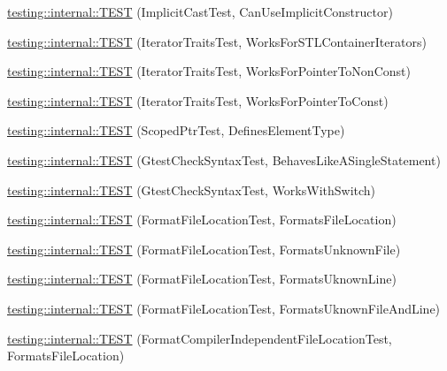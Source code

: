 \begin{DoxyCompactItemize}
\item 
\hyperlink{namespacetesting_1_1internal_ad5c2cf37cc5aa78744012255cae78f9b}{testing\+::internal\+::\+T\+E\+ST} (Implicit\+Cast\+Test, Can\+Use\+Implicit\+Constructor)
\item 
\hyperlink{namespacetesting_1_1internal_abd56ca990c5b8c1aea44d15028a74f33}{testing\+::internal\+::\+T\+E\+ST} (Iterator\+Traits\+Test, Works\+For\+S\+T\+L\+Container\+Iterators)
\item 
\hyperlink{namespacetesting_1_1internal_a642234d85836450bb8795cf0a8a9f908}{testing\+::internal\+::\+T\+E\+ST} (Iterator\+Traits\+Test, Works\+For\+Pointer\+To\+Non\+Const)
\item 
\hyperlink{namespacetesting_1_1internal_afc0e95a0472d243967fd4720c681c478}{testing\+::internal\+::\+T\+E\+ST} (Iterator\+Traits\+Test, Works\+For\+Pointer\+To\+Const)
\item 
\hyperlink{namespacetesting_1_1internal_a99f56e2e9d5b30a879f877cc72bb0c0c}{testing\+::internal\+::\+T\+E\+ST} (Scoped\+Ptr\+Test, Defines\+Element\+Type)
\item 
\hyperlink{namespacetesting_1_1internal_a26d00130a017a66d0d60dc5a02a13d25}{testing\+::internal\+::\+T\+E\+ST} (Gtest\+Check\+Syntax\+Test, Behaves\+Like\+A\+Single\+Statement)
\item 
\hyperlink{namespacetesting_1_1internal_a4dfd147ff396984fca799878cb53dcea}{testing\+::internal\+::\+T\+E\+ST} (Gtest\+Check\+Syntax\+Test, Works\+With\+Switch)
\item 
\hyperlink{namespacetesting_1_1internal_a1a1c20d78e9e75b9c7f2b767eb62611b}{testing\+::internal\+::\+T\+E\+ST} (Format\+File\+Location\+Test, Formats\+File\+Location)
\item 
\hyperlink{namespacetesting_1_1internal_ace2f5407afdfb0767035d44b6758e4a0}{testing\+::internal\+::\+T\+E\+ST} (Format\+File\+Location\+Test, Formats\+Unknown\+File)
\item 
\hyperlink{namespacetesting_1_1internal_a17d1f472b6c1154de7b5b008b964ee32}{testing\+::internal\+::\+T\+E\+ST} (Format\+File\+Location\+Test, Formats\+Uknown\+Line)
\item 
\hyperlink{namespacetesting_1_1internal_a1195aaf7258c5442de7aebd95acefb9f}{testing\+::internal\+::\+T\+E\+ST} (Format\+File\+Location\+Test, Formats\+Uknown\+File\+And\+Line)
\item 
\hyperlink{namespacetesting_1_1internal_a9c12f8c1ebb19906e8fa0c430d139076}{testing\+::internal\+::\+T\+E\+ST} (Format\+Compiler\+Independent\+File\+Location\+Test, Formats\+File\+Location)
\item 

\end{DoxyCompactItemize}
